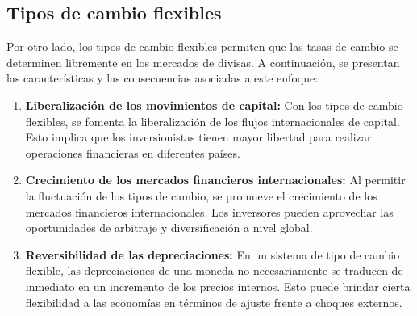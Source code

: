 \documentclass[
  a4paper,
]{article}
\begin{document}
\hypertarget{tipos-de-cambio-flexibles}{%
\subsection{Tipos de cambio flexibles}\label{tipos-de-cambio-flexibles}}

Por otro lado, los tipos de cambio flexibles permiten que las tasas de
cambio se determinen libremente en los mercados de divisas. A
continuación, se presentan las características y las consecuencias
asociadas a este enfoque:

\begin{enumerate}
\def\labelenumi{\arabic{enumi}.}
\item
  \textbf{Liberalización de los movimientos de capital:} Con los tipos
  de cambio flexibles, se fomenta la liberalización de los flujos
  internacionales de capital. Esto implica que los inversionistas tienen
  mayor libertad para realizar operaciones financieras en diferentes
  países.
\item
  \textbf{Crecimiento de los mercados financieros internacionales:} Al
  permitir la fluctuación de los tipos de cambio, se promueve el
  crecimiento de los mercados financieros internacionales. Los
  inversores pueden aprovechar las oportunidades de arbitraje y
  diversificación a nivel global.
\item
  \textbf{Reversibilidad de las depreciaciones:} En un sistema de tipo
  de cambio flexible, las depreciaciones de una moneda no necesariamente
  se traducen de inmediato en un incremento de los precios internos.
  Esto puede brindar cierta flexibilidad a las economías en términos de
  ajuste frente a choques externos.
\end{enumerate}


\printbibliography
\end{document}
